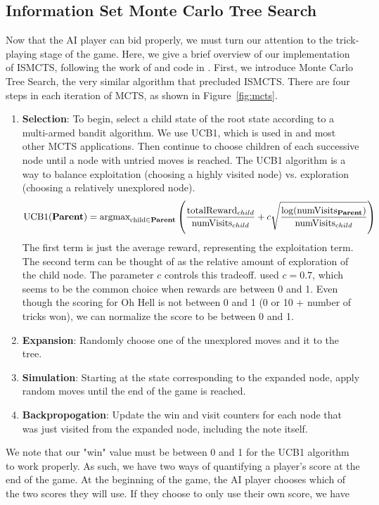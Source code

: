 \documentclass{article}
\begin{document}
\subsection{Information Set Monte Carlo Tree Search}
\label{subsection:ISMCTS}
Now that the AI player can bid properly, we must turn our attention to the trick-playing stage of the game. Here, we give a brief overview of our implementation of ISMCTS, following the work of \citet{cowling2012information} and code in \citep{Cowling2013}.
First, we introduce Monte Carlo Tree Search, the very similar algorithm that precluded ISMCTS. There are four steps in each iteration of MCTS, as shown in Figure~\ref{fig:mcts}.
\begin{enumerate}
    \item \textbf{Selection}: To begin, select a child state of the root state according to a multi-armed bandit algorithm. We use UCB1, which is used in \citep{cowling2012information} and most other MCTS applications. Then continue to choose children of each successive node until a node with untried moves is reached. The UCB1 algorithm is a way to balance exploitation (choosing a highly visited node) vs. exploration (choosing a relatively unexplored node).
    $$\text{UCB1(\textbf{Parent})} = \text{argmax}_{\text{child}\in \textbf{Parent}}\left(\frac{\text{totalReward}_{child}}{\text{numVisits}_{child}} + c\sqrt{\frac{\log(\text{numVisits}_{\textbf{Parent}})}{\text{numVisits}_{child}}}\right)$$
    The first term is just the average reward, representing the exploitation term. The second term can be thought of as the relative amount of exploration of the child node. The parameter $c$ controls this tradeoff. \citet{cowling2012information} used $c=0.7$, which seems to be the common choice when rewards are between 0 and 1. Even though the scoring for Oh Hell is not between 0 and 1 (0 or 10 + number of tricks won), we can normalize the score to be between 0 and 1.
    \item \textbf{Expansion}: Randomly choose one of the unexplored moves and it to the tree.
    \item \textbf{Simulation}: Starting at the state corresponding to the expanded node, apply random moves until the end of the game is reached.
    \item \textbf{Backpropogation}: Update the win and visit counters for each node that was just visited from the expanded node, including the note itself.
\end{enumerate}
We note that our "win" value must be between 0 and 1 for the UCB1 algorithm to work properly. As such, we have two ways of quantifying a player's score at the end of the game. At the beginning of the game, the AI player chooses which of the two scores they will use. If they choose to only use their own score, we have
\end{document}
